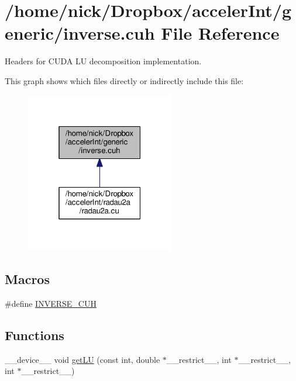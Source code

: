 \hypertarget{inverse_8cuh}{}\section{/home/nick/\+Dropbox/acceler\+Int/generic/inverse.cuh File Reference}
\label{inverse_8cuh}


Headers for C\+U\+DA LU decomposition implementation.  


This graph shows which files directly or indirectly include this file\+:
\nopagebreak
\begin{figure}[H]
\begin{center}
\leavevmode
\includegraphics[width=184pt]{inverse_8cuh__dep__incl}
\end{center}
\end{figure}
\subsection*{Macros}
\begin{DoxyCompactItemize}
\item 
\#define \hyperlink{inverse_8cuh_aff9b0f54fec8da78d669711592ceca2a}{I\+N\+V\+E\+R\+S\+E\+\_\+\+C\+UH}
\end{DoxyCompactItemize}
\subsection*{Functions}
\begin{DoxyCompactItemize}
\item 
\+\_\+\+\_\+device\+\_\+\+\_\+ void \hyperlink{inverse_8cuh_a138405fdf6512b1bf16282199a8f60cd}{get\+LU} (const int, double $\ast$\+\_\+\+\_\+restrict\+\_\+\+\_\+, int $\ast$\+\_\+\+\_\+restrict\+\_\+\+\_\+, int $\ast$\+\_\+\+\_\+restrict\+\_\+\+\_\+)
\end{DoxyCompactItemize}


